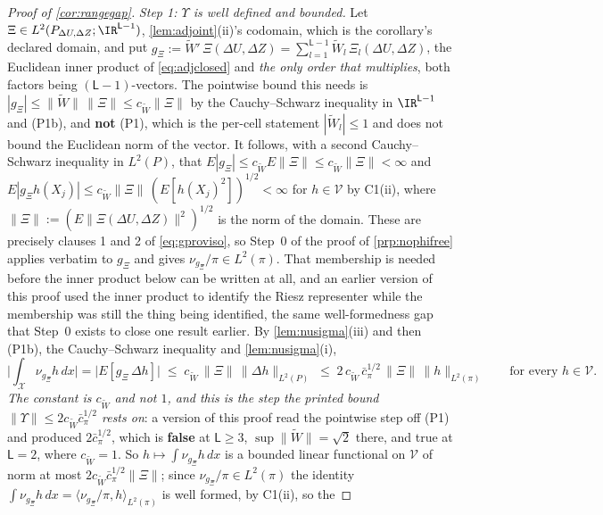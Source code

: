 \begin{proof}[Proof of \cref{cor:rangegap}]
\emph{Step 1: $\Upsilon$ is well defined and bounded.}
Let $\Xi\in L^{2}(P_{\Delta U,\Delta Z};\IR^{\mathsf L-1})$, \cref{lem:adjoint}\textup{(ii)}'s
codomain, which is the corollary's declared domain, and put
$g_\Xi:=\widetilde W'\,\Xi(\Delta U,\Delta Z)=\sum_{l=1}^{\mathsf L-1}\widetilde W_l\,\Xi_l(\Delta U,\Delta Z)$,
the Euclidean inner product of \eqref{eq:adjclosed} and \emph{the only order that multiplies}, both
factors being $(\mathsf L-1)$-vectors. The pointwise bound this needs is
$|g_\Xi|\le\|\widetilde W\|\,\|\Xi\|\le c_{\widetilde W}\|\Xi\|$ by the Cauchy--Schwarz inequality in
$\IR^{\mathsf L-1}$ and \textup{(P1b)}, and \textbf{not} \textup{(P1)}, which is the per-cell statement
$|\widetilde W_l|\le1$ and does not bound the Euclidean norm of the vector. It follows, with a second
Cauchy--Schwarz inequality in $L^{2}(P)$, that
$E|g_\Xi|\le c_{\widetilde W}E\|\Xi\|\le c_{\widetilde W}\|\Xi\|<\infty$ and
$E|g_\Xi h(X_j)|\le c_{\widetilde W}\|\Xi\|\,(E[h(X_j)^{2}])^{1/2}<\infty$ for $h\in\mathcal V$ by
C1(ii), where $\|\Xi\|:=(E\|\Xi(\Delta U,\Delta Z)\|^{2})^{1/2}$ is the norm of the domain. These
are precisely clauses 1 and 2 of \eqref{eq:gproviso}, so Step~0 of the proof of \cref{prp:nophifree}
applies verbatim to $g_\Xi$ and gives $\nu_{g_\Xi}/\pi\in L^{2}(\pi)$. That membership is needed before
the inner product below can be written at all, and an earlier version of this proof used the inner
product to identify the Riesz representer while the membership was still the thing being identified, 
the same well-formedness gap that Step~0 exists to close one result earlier. By
\cref{lem:nusigma}(iii) and then \textup{(P1b)}, the Cauchy--Schwarz inequality and \cref{lem:nusigma}(i),
\[
\Big|\int_{\mathcal X}\nu_{g_\Xi}h\,dx\Big|=\big|E[g_\Xi\,\Delta h]\big|
\;\le\;c_{\widetilde W}\,\|\Xi\|\,\big\|\Delta h\big\|_{L^{2}(P)}
\;\le\;2\,c_{\widetilde W}\,\bar c_\pi^{1/2}\,\|\Xi\|\,\|h\|_{L^{2}(\pi)}
\qquad\text{for every }h\in\mathcal V .
\]
\emph{The constant is $c_{\widetilde W}$ and not $1$, and this is the step the printed bound
$\|\Upsilon\|\le2c_{\widetilde W}\bar c_\pi^{1/2}$ rests on}: a version of this proof read the pointwise
step off \textup{(P1)} and produced $2\bar c_\pi^{1/2}$, which is \textbf{false} at $\mathsf L\ge3$, 
$\sup\|\widetilde W\|=\sqrt2$ there, and true at $\mathsf L=2$, where $c_{\widetilde W}=1$.
So $h\mapsto\int\nu_{g_\Xi}h\,dx$ is a bounded linear functional on $\mathcal V$ of norm at most
$2c_{\widetilde W}\bar c_\pi^{1/2}\|\Xi\|$; since $\nu_{g_\Xi}/\pi\in L^{2}(\pi)$ the identity
$\int\nu_{g_\Xi}h\,dx=\langle\nu_{g_\Xi}/\pi,h\rangle_{L^{2}(\pi)}$ is well formed, by C1(ii), so the

\end{proof}
